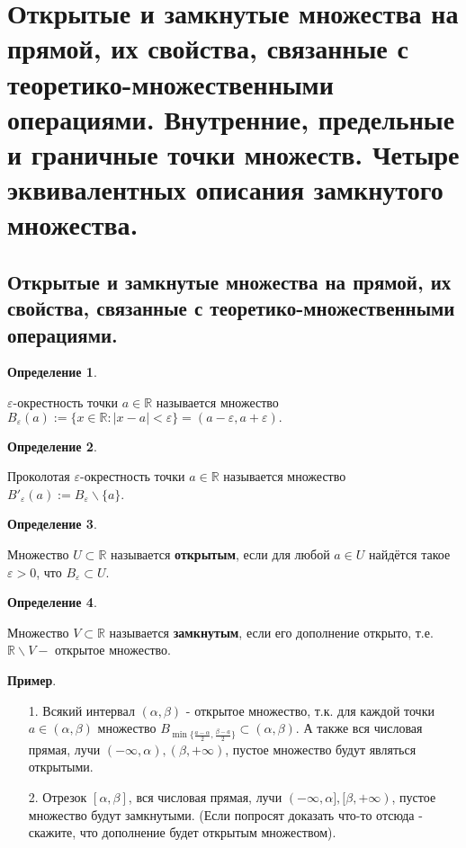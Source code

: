 \documentclass[12pt]{article}
\begin{document}
\section{Открытые и замкнутые множества на прямой, их свойства, связанные с теоретико-множественными операциями. Внутренние, предельные и граничные точки множеств. Четыре эквивалентных описания замкнутого множества.}

\subsection{Открытые и замкнутые множества на прямой, их свойства, связанные с теоретико-множественными операциями.}

\textbf{Определение 1}.

$\varepsilon$-окрестность точки $a \in\mathbb{R}$ называется множество $B_\varepsilon(a) := \{x\in\mathbb{R}: |x-a| < \varepsilon\} = (a-\varepsilon, a +\varepsilon).$

\textbf{Определение 2}.

Проколотая $\varepsilon$-окрестность точки $a \in\mathbb{R}$ называется множество $B'_\varepsilon(a) := B_\varepsilon \backslash \{a\}$.

\textbf{Определение 3}.

Множество $U\subset\mathbb{R}$ называется \textbf{открытым}, если для любой $a\in U$ найдётся такое $\varepsilon > 0$, что $B_\varepsilon \subset U$.

\textbf{Определение 4}.

Множество $V \subset\mathbb{R}$ называется \textbf{замкнутым}, если его дополнение открыто, т.е. $\mathbb{R} \backslash V - $ открытое множество.

\textbf{Пример}.

\begin{itemize}
    \item[1.] Всякий интервал $(\alpha,\beta)$ - открытое множество, т.к. для каждой точки $a \in (\alpha, \beta)$ множество $B_{\min\{\frac{a-\alpha}{2}, \frac{\beta-a}{2}\}} \subset (\alpha,\beta)$. А также вся числовая прямая, лучи $(-\infty, \alpha), (\beta, +\infty)$, пустое множество будут являться открытыми.
    \item[2.] Отрезок $[\alpha, \beta]$, вся числовая прямая, лучи $(-\infty, \alpha], [\beta, +\infty)$, пустое множество будут замкнутыми. (Если попросят доказать что-то отсюда - скажите, что дополнение будет открытым множеством).
\end{itemize}
\end{document}
